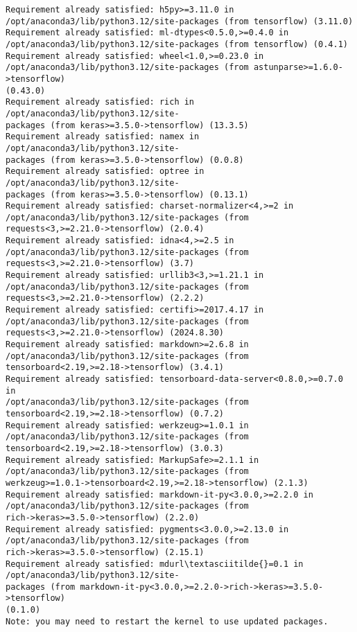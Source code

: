 \documentclass[11pt]{article}
\begin{document}
\begin{Verbatim}[commandchars=\\\{\}]
Requirement already satisfied: h5py>=3.11.0 in
/opt/anaconda3/lib/python3.12/site-packages (from tensorflow) (3.11.0)
Requirement already satisfied: ml-dtypes<0.5.0,>=0.4.0 in
/opt/anaconda3/lib/python3.12/site-packages (from tensorflow) (0.4.1)
Requirement already satisfied: wheel<1.0,>=0.23.0 in
/opt/anaconda3/lib/python3.12/site-packages (from astunparse>=1.6.0->tensorflow)
(0.43.0)
Requirement already satisfied: rich in /opt/anaconda3/lib/python3.12/site-
packages (from keras>=3.5.0->tensorflow) (13.3.5)
Requirement already satisfied: namex in /opt/anaconda3/lib/python3.12/site-
packages (from keras>=3.5.0->tensorflow) (0.0.8)
Requirement already satisfied: optree in /opt/anaconda3/lib/python3.12/site-
packages (from keras>=3.5.0->tensorflow) (0.13.1)
Requirement already satisfied: charset-normalizer<4,>=2 in
/opt/anaconda3/lib/python3.12/site-packages (from
requests<3,>=2.21.0->tensorflow) (2.0.4)
Requirement already satisfied: idna<4,>=2.5 in
/opt/anaconda3/lib/python3.12/site-packages (from
requests<3,>=2.21.0->tensorflow) (3.7)
Requirement already satisfied: urllib3<3,>=1.21.1 in
/opt/anaconda3/lib/python3.12/site-packages (from
requests<3,>=2.21.0->tensorflow) (2.2.2)
Requirement already satisfied: certifi>=2017.4.17 in
/opt/anaconda3/lib/python3.12/site-packages (from
requests<3,>=2.21.0->tensorflow) (2024.8.30)
Requirement already satisfied: markdown>=2.6.8 in
/opt/anaconda3/lib/python3.12/site-packages (from
tensorboard<2.19,>=2.18->tensorflow) (3.4.1)
Requirement already satisfied: tensorboard-data-server<0.8.0,>=0.7.0 in
/opt/anaconda3/lib/python3.12/site-packages (from
tensorboard<2.19,>=2.18->tensorflow) (0.7.2)
Requirement already satisfied: werkzeug>=1.0.1 in
/opt/anaconda3/lib/python3.12/site-packages (from
tensorboard<2.19,>=2.18->tensorflow) (3.0.3)
Requirement already satisfied: MarkupSafe>=2.1.1 in
/opt/anaconda3/lib/python3.12/site-packages (from
werkzeug>=1.0.1->tensorboard<2.19,>=2.18->tensorflow) (2.1.3)
Requirement already satisfied: markdown-it-py<3.0.0,>=2.2.0 in
/opt/anaconda3/lib/python3.12/site-packages (from
rich->keras>=3.5.0->tensorflow) (2.2.0)
Requirement already satisfied: pygments<3.0.0,>=2.13.0 in
/opt/anaconda3/lib/python3.12/site-packages (from
rich->keras>=3.5.0->tensorflow) (2.15.1)
Requirement already satisfied: mdurl\textasciitilde{}=0.1 in /opt/anaconda3/lib/python3.12/site-
packages (from markdown-it-py<3.0.0,>=2.2.0->rich->keras>=3.5.0->tensorflow)
(0.1.0)
Note: you may need to restart the kernel to use updated packages.
    \end{Verbatim}
\end{document}
